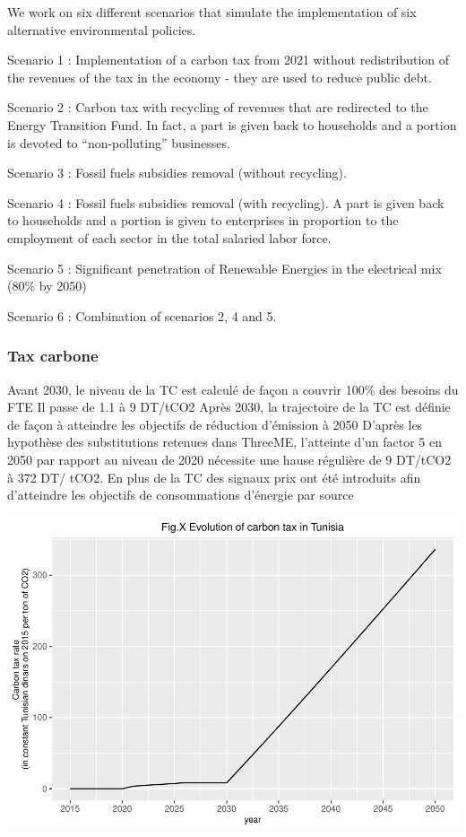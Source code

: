 \documentclass[
]{article}
\begin{document}
We work on six different scenarios that simulate the implementation of
six alternative environmental policies.

Scenario 1 : Implementation of a carbon tax from 2021 without
redistribution of the revenues of the tax in the economy - they are used
to reduce public debt.

Scenario 2 : Carbon tax with recycling of revenues that are redirected
to the Energy Transition Fund. In fact, a part is given back to
households and a portion is devoted to ``non-polluting'' businesses.

Scenario 3 : Fossil fuels subsidies removal (without recycling).

Scenario 4 : Fossil fuels subsidies removal (with recycling). A part is
given back to households and a portion is given to enterprises in
proportion to the employment of each sector in the total salaried labor
force.

Scenario 5 : Significant penetration of Renewable Energies in the
electrical mix (80\% by 2050)

Scenario 6 : Combination of scenarios 2, 4 and 5.

\hypertarget{tax-carbone}{%
\subsubsection{Tax carbone}\label{tax-carbone}}

Avant 2030, le niveau de la TC est calculé de façon a couvrir 100\% des
besoins du FTE Il passe de 1.1 à 9 DT/tCO2 Après 2030, la trajectoire de
la TC est définie de façon à atteindre les objectifs de réduction
d'émission à 2050 D'après les hypothèse des substitutions retenues dans
ThreeME, l'atteinte d'un factor 5 en 2050 par rapport au niveau de 2020
nécessite une hause régulière de 9 DT/tCO2 à 372 DT/ tCO2. En plus de la
TC des signaux prix ont été introduits afin d'atteindre les objectifs de
consommations d'énergie par source

\includegraphics{Modele-ThreeMe-Tunisie_Sequeira_Valilou_Wang_files/figure-latex/unnamed-chunk-6-1.pdf}
\end{document}
